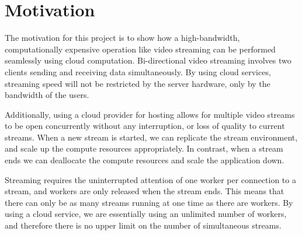 \documentclass[conference]{IEEEtran}
\begin{document}
\section{Motivation}
The motivation for this project is to show how a high-bandwidth, computationally expensive operation like video streaming can be performed seamlessly using cloud computation. Bi-directional video streaming involves two clients sending and receiving data simultaneously. By using cloud services, streaming speed will not be restricted by the server hardware, only by the bandwidth of the users. 
\par
Additionally, using a cloud provider for hosting allows for multiple video streams to be open concurrently without any interruption, or loss of quality to current streams. When a new stream is started, we can replicate the stream environment, and scale up the compute resources appropriately. In contrast, when a stream ends we can deallocate the compute resources and scale the application down. 
\par
Streaming requires the uninterrupted attention of one worker per connection to a stream, and workers are only released when the stream ends. This means that there can only be as many streams running at one time as there are workers. By using a cloud service, we are essentially using an unlimited number of workers, and therefore there is no upper limit on the number of simultaneous streams.
\end{document}
